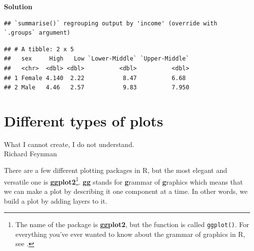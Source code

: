 \documentclass[
  12pt,
  krantz2]{krantz}
\makeatletter
\newenvironment{Shaded}{\begin{snugshade}}{\end{snugshade}}
\newcommand{\DataTypeTok}[1]{\textcolor[rgb]{0.13,0.29,0.53}{#1}}
\newcommand{\DecValTok}[1]{\textcolor[rgb]{0.00,0.00,0.81}{#1}}
\newcommand{\KeywordTok}[1]{\textcolor[rgb]{0.13,0.29,0.53}{\textbf{#1}}}
\newcommand{\NormalTok}[1]{#1}
\newcommand{\OperatorTok}[1]{\textcolor[rgb]{0.81,0.36,0.00}{\textbf{#1}}}
\newcommand{\StringTok}[1]{\textcolor[rgb]{0.31,0.60,0.02}{#1}}
\renewenvironment{quote}{\begin{VF}}{\end{VF}}
\newenvironment{kframe}{%
\medskip{}
\setlength{\fboxsep}{.8em}
 \def\at@end@of@kframe{}%
 \ifinner\ifhmode%
  \def\at@end@of@kframe{\end{minipage}}%
  \begin{minipage}{\columnwidth}%
 \fi\fi%
 \def\FrameCommand##1{\hskip\@totalleftmargin \hskip-\fboxsep
 \colorbox{shadecolor}{##1}\hskip-\fboxsep
     \hskip-\linewidth \hskip-\@totalleftmargin \hskip\columnwidth}%
 \MakeFramed {\advance\hsize-\width
   \@totalleftmargin\z@ \linewidth\hsize
   \@setminipage}}%
 {\par\unskip\endMakeFramed%
 \at@end@of@kframe}
\renewenvironment{Shaded}{\begin{kframe}}{\end{kframe}}
\makeatother
\begin{document}
\textbf{Solution}

\begin{Shaded}
\end{Shaded}

\begin{verbatim}
## `summarise()` regrouping output by 'income' (override with `.groups` argument)
\end{verbatim}

\begin{verbatim}
## # A tibble: 2 x 5
##   sex     High   Low `Lower-Middle` `Upper-Middle`
##   <chr>  <dbl> <dbl>          <dbl>          <dbl>
## 1 Female 4.140  2.22           8.47          6.68 
## 2 Male   4.46   2.57           9.83          7.950
\end{verbatim}

\hypertarget{chap04-h1}{%
\chapter{Different types of plots}\label{chap04-h1}}


\begin{quote}
What I cannot create, I do not understand.\\
Richard Feynman
\end{quote}

There are a few different plotting packages in R, but the most elegant and versatile one is \textbf{ggplot2}\footnote{The name of the package is \textbf{ggplot2}, but the function is called \texttt{ggplot()}. For everything you've ever wanted to know about the grammar of graphics in R, see \citet{wickham2016}.}.
\textbf{gg} stands for \textbf{g}rammar of \textbf{g}raphics which means that we can make a plot by describing it one component at a time.
In other words, we build a plot by adding layers to it.
\end{document}
